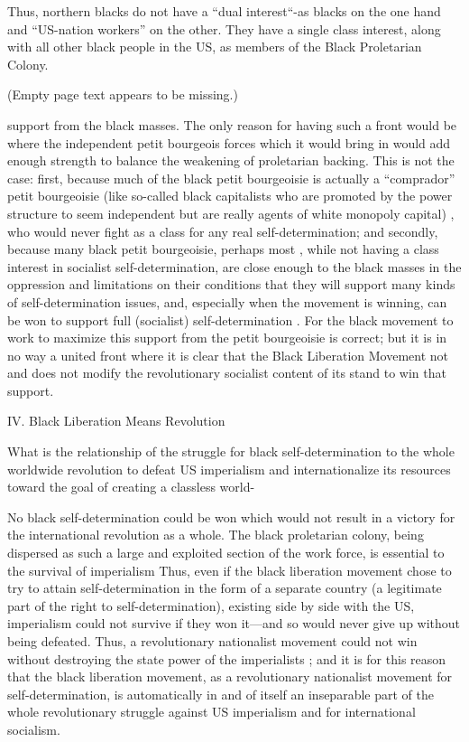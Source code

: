 \documentclass[12pt, titlepage]{article}
\begin{document}
{\begin{spacing}{1.10}
Thus, northern blacks do not have a ``dual interest``-as blacks on the one hand and ``US-nation workers'' on the other. They have a single class interest, along with all other black people in the US, as members of the Black Proletarian Colony.

(Empty page text appears to be missing.)

support from the black masses. The only reason for having such a front would be where the independent petit bourgeois forces which it would bring in would add enough strength to balance the weakening of proletarian backing. This is not the case: first, because much of the black petit bourgeoisie is actually a ``comprador'' petit bourgeoisie (like so-called black capitalists who are promoted by the power structure to seem independent but are really agents of white monopoly capital) , who would never fight as a class for any real self-determination; and secondly, because many black petit bourgeoisie, perhaps most , while not having a class interest in socialist self-determination, are close enough to the black masses in the oppression and limitations on their conditions that they will support many kinds of self-determination issues, and, especially when the movement is winning, can be won to support full (socialist) self-determination . For the black movement to work to maximize this support from the petit bourgeoisie is correct; but it is in no way a united front where it is clear that the Black Liberation Movement not and does not modify the revolutionary socialist content of its stand to win that support.

\begin{center}
IV. Black Liberation Means Revolution
\end{center}

What is the relationship of the struggle for black self-determination to the whole worldwide revolution to defeat US imperialism and internationalize its resources toward the goal of creating a classless world-

No black self-determination could be won which would not result in a victory for the international revolution as a whole. The black proletarian colony, being dispersed as such a large and exploited section of the work force, is essential to the survival of imperialism Thus, even if the black liberation movement chose to try to attain self-determination in the form of a separate country (a legitimate part of the right to self-determination), existing side by side with the US, imperialism could not survive if they won it—and so would never give up without being defeated. Thus, a revolutionary nationalist movement could not win without destroying the state power of the imperialists ; and it is for this reason that the black liberation movement, as a revolutionary nationalist movement for self-determination, is automatically in and of itself an inseparable part of the whole revolutionary struggle against US imperialism and for international socialism.


\end{spacing}}
\end{document}
